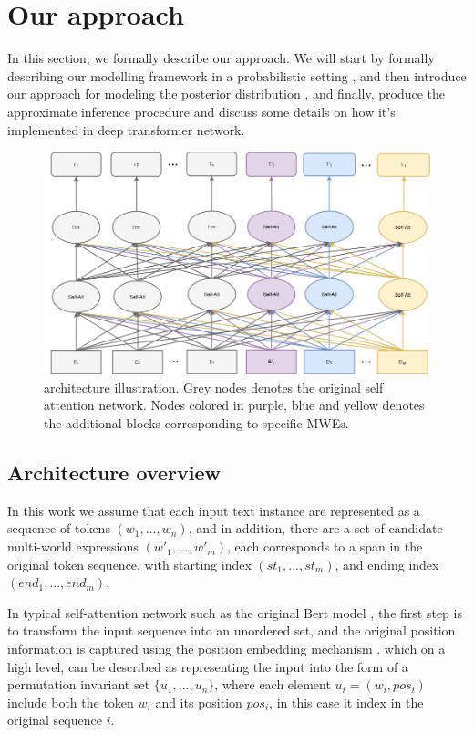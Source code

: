 

\section{Our approach}
In this section, we formally describe our \BertMWE approach.
We will start by formally describing our modelling framework in a probabilistic setting , 
and then introduce our approach for modeling the posterior distribution , 
and finally, produce the approximate inference procedure
and discuss some details on how it's implemented in deep transformer network.


\begin{figure}[tb]
    \centering
    \includegraphics[width=0.95\linewidth]{fig/architecture.png}
    \vspace{20pt}
    \caption{\BertMWE architecture illustration. Grey nodes denotes the original self attention network. Nodes colored in purple, blue and yellow denotes the additional blocks corresponding to specific MWEs.}
    \vspace{10pt}
    \label{fig:variational}
\end{figure}


\subsection{Architecture overview}\label{sec:arch-overview}
In this work we assume that each input text instance are represented as a sequence of tokens $(w_1, ..., w_n)$,
and in addition, there are a set of candidate multi-world expressions $(w'_1, ..., w'_m)$, each corresponds to a span in the original token sequence, with starting index $(st_1, ..., st_m)$, and ending index $(end_1, ..., end_m)$. 

In typical self-attention network such as the original Bert model \cite{devlin2018bert}, the first step is to transform the input sequence into an unordered set, 
and the original position information is captured using the position embedding mechanism \cite{vaswani2017attention}. which on a high level, can be described as representing the input into the form of a permutation invariant set $\{u_1, ..., u_n\}$, where each element $u_i=(w_i, pos_i)$ include both the token $w_i$ and its position $pos_i$, in this case it index in the original sequence $i$.

